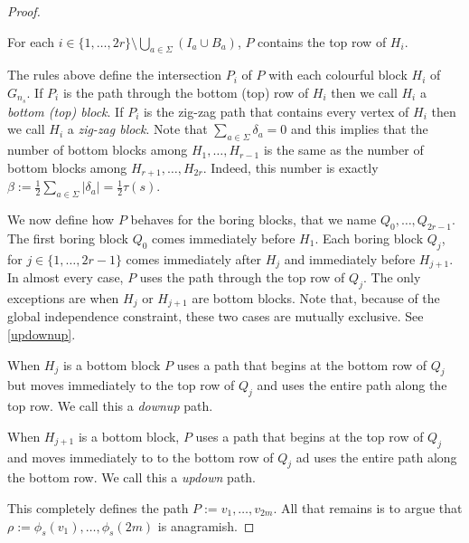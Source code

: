 \documentclass{patmorin}
\begin{document}
\begin{proof}
\begin{compactenum}
        \item For each $i\in\{1,\ldots,2r\}\setminus\bigcup_{a\in\Sigma}(I_a\cup B_a)$, $P$ contains the top row of $H_i$.
    \end{compactenum}
    The rules above define the intersection $P_i$ of $P$ with each colourful block $H_i$ of $G_{n_s}$.  If $P_i$ is the path through the bottom (top) row of $H_i$ then we call $H_i$ a \emph{bottom (top) block}.  If $P_i$ is the zig-zag path that contains every vertex of $H_i$ then we call $H_i$ a \emph{zig-zag block}.  Note that $\sum_{a\in\Sigma} \delta_a = 0$ and this implies that the number of bottom blocks among $H_1,\ldots,H_{r-1}$ is the same as the number of bottom blocks among $H_{r+1},\ldots,H_{2r}$.  Indeed, this number is exactly $\beta:=\tfrac{1}{2}\sum_{a\in\Sigma} |\delta_a|=\tfrac{1}{2}\tau(s)$.

    We now define how $P$ behaves for the boring blocks, that we name $Q_0,\ldots,Q_{2r-1}$. The first boring block $Q_0$ comes immediately before $H_1$. Each boring block $Q_j$, for $j\in\{1,\ldots,2r-1\}$ comes immediately after $H_j$ and immediately before $H_{j+1}$.  In almost every case, $P$ uses the path through the top row of $Q_j$.  The only exceptions are when $H_j$ or $H_{j+1}$ are bottom blocks. Note that, because of the global independence constraint, these two cases are mutually exclusive. See \cref{updownup}.

    \begin{figure}
    \end{figure}

    \begin{compactenum}
        \item When $H_j$ is a bottom block $P$ uses a path that begins at the bottom row of $Q_j$ but moves immediately to the top row of $Q_j$ and uses the entire path along the top row. We call this a \emph{downup} path.
        \item When $H_{j+1}$ is a bottom block, $P$ uses a path that begins at the top row of $Q_j$ and moves immediately to to the bottom row of $Q_j$ ad uses the entire path along the bottom row.  We call this a \emph{updown} path.
    \end{compactenum}
    This completely defines the path $P:=v_1,\ldots,v_{2m}$. All that remains is to argue that $\rho:=\phi_s(v_1),\ldots,\phi_s(2m)$ is anagramish.


\end{proof}
\end{document}
